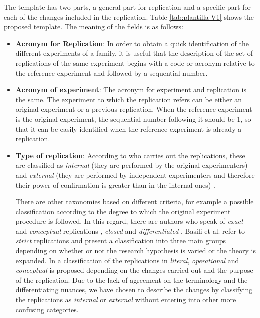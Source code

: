  The template has two parts, a general part for replication and a specific part for each of the changes included in the replication. Table \ref{tab:plantilla-V1} shows the proposed template. The meaning of the fields is as follows:
\begin{itemize}
\item \textbf {Acronym for Replication}: In order to obtain a quick identification of the different experiments of a family, it is useful that the description of the set of replications of the same experiment begins with a code or acronym relative to the reference experiment and followed by a sequential number. 
\item \textbf {Acronym of experiment}: The acronym for experiment and replication is the same. The experiment to which the replication refers can be either an original experiment or a previous replication. When the reference experiment is the original experiment, the sequential number following it should be 1, so that it can be easily identified when the reference experiment is already a replication.



\item \textbf {Type of replication}: According to who carries out the replications, these are classified as \textit{internal} (they are performed by the original experimenters) and \textit{external} (they are performed by independent experimenters and therefore their power of confirmation is greater than in the internal ones) \cite{brooks1996replication}.

There are other taxonomies based on different criteria, for example a possible classification according to the degree to which the original experiment procedure is followed. In this regard, there are authors who speak of \textit{exact} and \textit{conceptual} replications \cite{shull2008role},  \textit{closed} and \textit{differentiated}  \cite{1330459,lindsay1993design,juristo2011role}. Basili et al. \cite{basili1999building} refer to \textit{strict} replications and present a classification into three main groups depending on whether or not the research hypothesis is varied or the theory is expanded. In \cite{gomez2014understanding} a classification of the replications in \textit{literal}, \textit{operational} and \textit{conceptual} is proposed depending on the changes carried out and the purpose of the replication. Due to the lack of agreement on the terminology \cite{gomez2014understanding} and the differentiating nuances, we have chosen to describe the changes by classifying the replications as  \textit{internal} or  \textit{external} without entering into other more confusing categories. 


\end{itemize}
